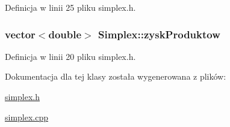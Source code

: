\-Definicja w linii 25 pliku simplex.\-h.

\hypertarget{class_simplex_a3069699ee42dbdb3d94653cefcefd9cc}{
\subsubsection[{zysk\-Produktow}]{\setlength{\rightskip}{0pt plus 5cm}vector$<$double$>$ {\bf \-Simplex\-::zysk\-Produktow}}}\label{class_simplex_a3069699ee42dbdb3d94653cefcefd9cc}


\-Definicja w linii 20 pliku simplex.\-h.



\-Dokumentacja dla tej klasy została wygenerowana z plików\-:\begin{DoxyCompactItemize}
\item 
\hyperlink{simplex_8h}{simplex.\-h}\item 
\hyperlink{simplex_8cpp}{simplex.\-cpp}\end{DoxyCompactItemize}
